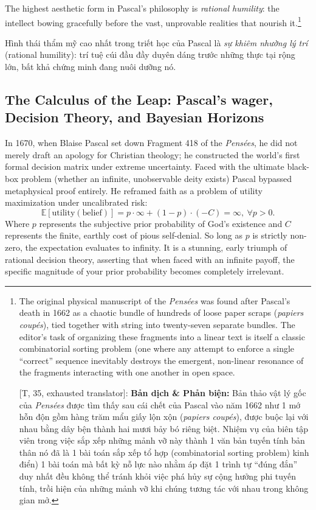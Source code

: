 \documentclass[11pt]{article}
\begin{document}
The highest aesthetic form in Pascal's philosophy is \emph{rational humility}: the intellect bowing gracefully before the vast, unprovable realities that nourish it.\footnote{The original physical manuscript of the \textit{Pens\'ees} was found after Pascal's death in 1662 as a chaotic bundle of hundreds of loose paper scraps (\textit{papiers coup\'es}), tied together with string into twenty-seven separate bundles. The editor's task of organizing these fragments into a linear text is itself a classic combinatorial sorting problem (one where any attempt to enforce a single ``correct'' sequence inevitably destroys the emergent, non-linear resonance of the fragments interacting with one another in open space.
	
	\textsf{[T, 35, exhausted translator]:} \textbf{Bản dịch \& Phản biện:} Bản thảo vật lý gốc của \textit{Pens\'ees} được tìm thấy sau cái chết của Pascal vào năm 1662 như 1 mớ hỗn độn gồm hàng trăm mẩu giấy lộn xộn (\textit{papiers coup\'es}), được buộc lại với nhau bằng dây bện thành hai mươi bảy bó riêng biệt. Nhiệm vụ của biên tập viên trong việc sắp xếp những mảnh vỡ này thành 1 văn bản tuyến tính bản thân nó đã là 1 bài toán sắp xếp tổ hợp (combinatorial sorting problem) kinh điển) 1 bài toán mà bất kỳ nỗ lực nào nhằm áp đặt 1 trình tự ``đúng đắn'' duy nhất đều không thể tránh khỏi việc phá hủy sự cộng hưởng phi tuyến tính, trồi hiện của những mảnh vỡ khi chúng tương tác với nhau trong không gian mở.}

Hình thái thẩm mỹ cao nhất trong triết học của Pascal là \emph{sự khiêm nhường lý trí} (rational humility): trí tuệ cúi đầu đầy duyên dáng trước những thực tại rộng lớn, bất khả chứng minh đang nuôi dưỡng nó.

\subsection{The Calculus of the Leap: Pascal's wager, Decision Theory, and Bayesian Horizons}
In 1670, when Blaise Pascal set down Fragment 418 of the \textit{Pens\'ees}, he did not merely draft an apology for Christian theology; he constructed the world's first formal decision matrix under extreme uncertainty. Faced with the ultimate black-box problem (whether an infinite, unobservable deity exists) Pascal bypassed metaphysical proof entirely. He reframed faith as a problem of utility maximization under uncalibrated risk:
\begin{equation*}
	\mathbb{E}[\text{utility}(\text{belief})] = p \cdot \infty + (1 - p) \cdot(-C) = \infty,\ \forall p > 0.
\end{equation*}
Where $p$ represents the subjective prior probability of God's existence and $C$ represents the finite, earthly cost of pious self-denial. So long as $p$ is strictly non-zero, the expectation evaluates to infinity. It is a stunning, early triumph of rational decision theory, asserting that when faced with an infinite payoff, the specific magnitude of your prior probability becomes completely irrelevant.
\end{document}
